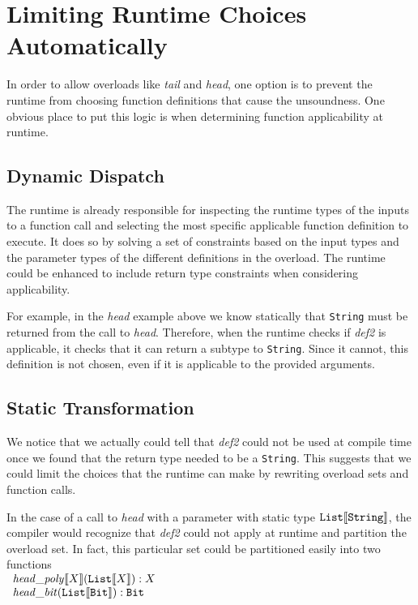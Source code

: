 \documentclass[preprint]{sigplanconf}
\newcommand{\ob}[1]{\ensuremath{\llbracket {#1} \rrbracket}}
\begin{document}
\section{Limiting Runtime Choices Automatically}

In order to allow overloads like {\it tail} and {\it head}, one option is to prevent the runtime from choosing
function definitions that cause the unsoundness.  One obvious place to put this logic is when determining
function applicability at runtime.

\subsection{Dynamic Dispatch}

The runtime is already responsible for inspecting the runtime types of the inputs to a function call and 
selecting the most specific applicable function definition to execute.  It does so by solving a set of constraints 
based on the input types and the parameter types of the different definitions in the overload.  The runtime could
be enhanced to include return type constraints when considering applicability.  

For example, in the {\it head} example above we know statically that {\tt String} must be returned 
from the call to {\it head}.  Therefore, when the runtime checks if {\it def2} is applicable, it checks
that it can return a subtype to {\tt String}.  Since it cannot, this definition is not chosen, even if it
is applicable to the provided arguments.

\subsection{Static Transformation}

We notice that we actually could tell that {\it def2} could not be used at compile time once we found
that the return type needed to be a {\tt String}.  This suggests that we could limit the choices that the
runtime can make by rewriting overload sets and function calls.  

In the case of a call to {\it head} with a parameter
with static type ${\tt List}\ob{{\tt String}}$, the compiler would recognize that {\it def2} could not apply at runtime
and partition the overload set.  In fact, this particular set could be partitioned easily into two functions\\

$\begin{array}{l}
{\it head\_poly}\ob{X}({\tt List}\ob{X}) :X\\
{\it head\_bit}({\tt List}\ob{{\tt Bit}}) : {\tt Bit}\\
\end{array}$\\
\end{document}
